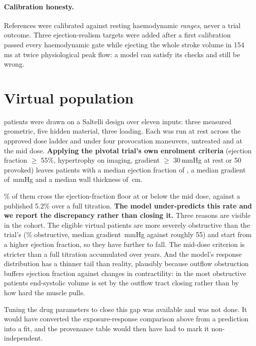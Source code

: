 \documentclass[11pt,a4paper]{article}
\newcommand{\claim}[1]{\textcolor{accent}{\textbf{#1}}}
\newcommand{\caution}[1]{\textcolor{warn}{\textbf{#1}}}
\begin{document}
\paragraph{Calibration honesty.} References were calibrated against resting haemodynamic
\emph{ranges}, never a trial outcome. Three ejection-realism targets were added after a first
calibration passed every haemodynamic gate while ejecting the whole stroke volume in 154\,ms
at twice physiological peak flow: a model can satisfy its checks and still be wrong.

\section{Virtual population}

\nSampled{} patients were drawn on a Saltelli design over eleven inputs: three measured
geometric, five hidden material, three loading. Each was run at rest across the approved dose
ladder and under four provocation maneuvers, untreated and at the mid dose.
\claim{Applying the pivotal trial's own enrolment criteria} (ejection fraction $\geq$ 55\%,
hypertrophy on imaging, gradient $\geq$ 30\,mmHg at rest or 50 provoked) leaves \nEligible{}
patients with a median ejection fraction of \medianEligibleEF{}, a median gradient of
\medianEligibleGradient\,mmHg and a median wall thickness of \medianEligibleWall\,cm.

\overResponderRate\% of them cross the ejection-fraction floor at or below the mid dose,
against a published 5.2\% over a full titration. \caution{The model under-predicts this
rate and we report the discrepancy rather than closing it.} Three reasons are visible in
the cohort. The eligible virtual patients are more severely obstructive than the trial's
(\obstructiveFraction\% obstructive, median gradient \medianEligibleGradient\,mmHg against
roughly 55) and start from a higher ejection fraction, so they have further to fall. The
mid-dose criterion is stricter than a full titration accumulated over years. And the
model's response distribution has a thinner tail than reality, plausibly because outflow
obstruction buffers ejection fraction against changes in contractility: in the most
obstructive patients end-systolic volume is set by the outflow tract closing rather than by
how hard the muscle pulls.

Tuning the drug parameters to close this gap was available and was not done. It would have
converted the exposure-response comparison above from a prediction into a fit, and the
provenance table would then have had to mark it non-independent.
\end{document}
